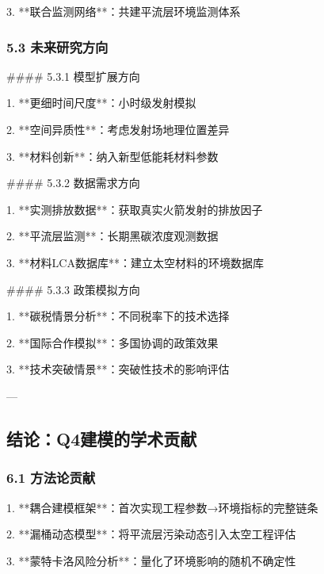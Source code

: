 \documentclass[a4paper,12pt]{article}
\begin{document}
\par
3. **联合监测网络**：共建平流层环境监测体系

\par
\subsubsection{5.3 未来研究方向}
#### 5.3.1 模型扩展方向

\par
1. **更细时间尺度**：小时级发射模拟

\par
2. **空间异质性**：考虑发射场地理位置差异

\par
3. **材料创新**：纳入新型低能耗材料参数

\par
#### 5.3.2 数据需求方向

\par
1. **实测排放数据**：获取真实火箭发射的排放因子

\par
2. **平流层监测**：长期黑碳浓度观测数据

\par
3. **材料LCA数据库**：建立太空材料的环境数据库

\par
#### 5.3.3 政策模拟方向

\par
1. **碳税情景分析**：不同税率下的技术选择

\par
2. **国际合作模拟**：多国协调的政策效果

\par
3. **技术突破情景**：突破性技术的影响评估

\par
---

\par
\subsection{结论：Q4建模的学术贡献}
\subsubsection{6.1 方法论贡献}
1. **耦合建模框架**：首次实现工程参数→环境指标的完整链条

\par
2. **漏桶动态模型**：将平流层污染动态引入太空工程评估

\par
3. **蒙特卡洛风险分析**：量化了环境影响的随机不确定性
\end{document}
